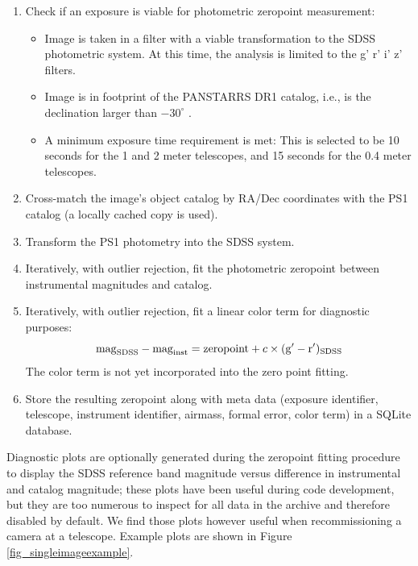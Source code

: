 \documentclass[]{spieman}
\begin{document}
 
\begin{enumerate} 
    \item Check if an exposure is viable for photometric zeropoint measurement:
   
    \begin{itemize} 
        \item Image is taken in a filter with a viable transformation to the SDSS
        photometric system. At this time, the analysis is limited to the g' r' i' z' filters. 
        
        \item Image is in footprint of the PANSTARRS DR1 catalog, i.e., is the declination larger
         than $-30^\circ$ . 
        
        \item A minimum exposure time requirement is met: This is selected to be 10 seconds for the
         1 and 2 meter telescopes, and 15 seconds for the 0.4 meter telescopes. 
        
    \end{itemize}
    
    \item Cross-match the image's object catalog by RA/Dec coordinates with the PS1 catalog (a 
    locally cached copy is used). 
    
    \item Transform the PS1 photometry into the SDSS system\cite{finkbeiner2016}.
    
    \item Iteratively, with outlier rejection, fit the photometric zeropoint between instrumental
    magnitudes and catalog. \item Iteratively, with outlier rejection, fit a linear color term for
    diagnostic purposes: $$ {\rm mag}_{\rm SDSS} - {\rm mag}_{\rm inst} = {\rm zeropoint} + c \times
    ({\rm g'}-{ \rm r'})_{\rm SDSS}$$ The color term is not yet incorporated into the zero point
    fitting. \item Store the resulting zeropoint along with meta data (exposure identifier, 
    telescope, instrument identifier, airmass, formal error, color term) in a SQLite database. 
\end{enumerate}

Diagnostic plots are optionally generated during the zeropoint fitting procedure to display the
SDSS reference band magnitude versus difference in instrumental and catalog magnitude; these plots
have been useful during code development, but they are too numerous to inspect for all data in the
archive and therefore disabled by default. We find those plots however useful when recommissioning a
camera at a telescope. Example plots are shown in Figure \ref{fig_singleimageexample}.
\end{document}
